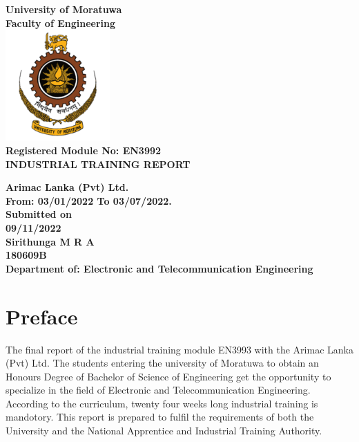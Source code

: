 \documentclass[twoside,12pt,times,onecolumn,a4paper]{report}
\begin{document}
\begin{titlepage}
\pagecolor{lightpink}\afterpage{\nopagecolor}
\center 

\textbf{\Huge University of Moratuwa}\\[1cm]
\textbf{\Large Faculty of Engineering}\\[1cm]

\includegraphics[width=0.3\textwidth]{uomlogo}\\[2cm]

	
\textbf{\Large {Registered Module No: EN3992 }  }\\[1cm]
\textbf{\Large {INDUSTRIAL TRAINING REPORT}}\\[1cm]
\vspace{1cm}

\begin{minipage}{1\textwidth}
	\begin{flushleft}
		\center 
		\textbf{\Large {Arimac Lanka (Pvt) Ltd.}  }\\[1cm]
		\textbf{\Large {From: 03/01/2022 To 03/07/2022.}  }\\[1cm]
		\textbf{\large Submitted on}\\[0.1cm]
		\textbf{\Large 09/11/2022}\\[0.5cm]
		\textbf{\large Sirithunga M R A}\\[0.1cm]
		\textbf{\large 180609B}\\[0.5cm]
		\textbf{\large Department of: Electronic and Telecommunication Engineering}\\[0.5cm]
	\end{flushleft}
\end{minipage}
\hspace{5mm}



\vfill
\end{titlepage}

\chapter*{Preface}
\hspace{3em} The final report of the industrial training module EN3993 with the Arimac Lanka (Pvt) Ltd. The students entering the university of Moratuwa to obtain an Honours Degree of Bachelor of Science of Engineering get the opportunity to specialize in the field of Electronic and Telecommunication Engineering. According to the curriculum, twenty four weeks long industrial training is mandotory. This report is prepared to fulfil the requirements of both the University and the National Apprentice and Industrial Training Authority. 
\end{document}
